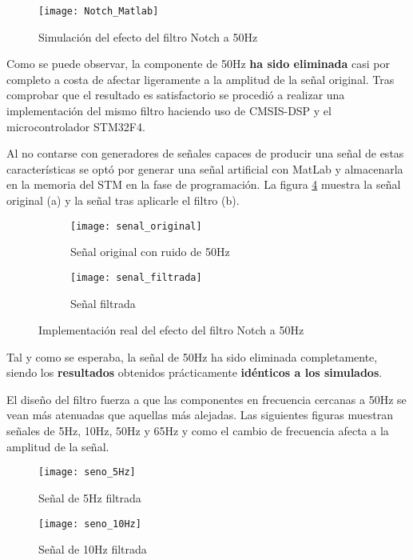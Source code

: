 \begin{figure} [h]
    \centering
    \texttt{[image: Notch\_Matlab]}
    \caption{Simulación del efecto del filtro Notch a 50Hz}
    \label{fig:Notch_Matlab}
\end{figure}

Como se puede observar, la componente de 50Hz \textbf{ha sido eliminada} casi por completo a costa de afectar ligeramente a la amplitud de la señal original. Tras comprobar que el resultado es satisfactorio se procedió a realizar una implementación del mismo filtro haciendo uso de CMSIS-DSP y el microcontrolador STM32F4.

Al no contarse con generadores de señales capaces de producir una señal de estas características se optó por generar una señal artificial con MatLab y almacenarla en la memoria del STM en la fase de programación. La figura \ref{fig:Filtro_en_STM} muestra la señal original (a) y la señal tras aplicarle el filtro (b).

\begin{figure}[H]
  \begin{subfigure}[b]{8cm}
   	\centering
    \texttt{[image: senal\_original]}
    \caption{Señal original con ruido de 50Hz}
    \label{fig:senal_original}
  \end{subfigure}
  \hfill
  \begin{subfigure}[b]{8cm}
  	\centering
    \texttt{[image: senal\_filtrada]}
    \caption{Señal filtrada}
    \label{fig:senal_original}
  \end{subfigure}
  \caption{Implementación real del efecto del filtro Notch a 50Hz}
  \label{fig:Filtro_en_STM}
\end{figure}

Tal y como se esperaba, la señal de 50Hz ha sido eliminada completamente, siendo los \textbf{resultados} obtenidos prácticamente \textbf{idénticos a los simulados}.

El diseño del filtro fuerza a que las componentes en frecuencia cercanas a 50Hz se vean más atenuadas que aquellas más alejadas. Las siguientes figuras muestran señales de 5Hz, 10Hz, 50Hz y 65Hz y como el cambio de frecuencia afecta a la amplitud de la señal.

\begin{figure} [H]
    \centering
    \texttt{[image: seno\_5Hz]}
    \caption{Señal de 5Hz filtrada}
    \label{fig:seno_5Hz}
\end{figure}

\begin{figure} [H]
    \centering
    \texttt{[image: seno\_10Hz]}
    \caption{Señal de 10Hz filtrada}
    \label{fig:seno_10Hz}
\end{figure}

